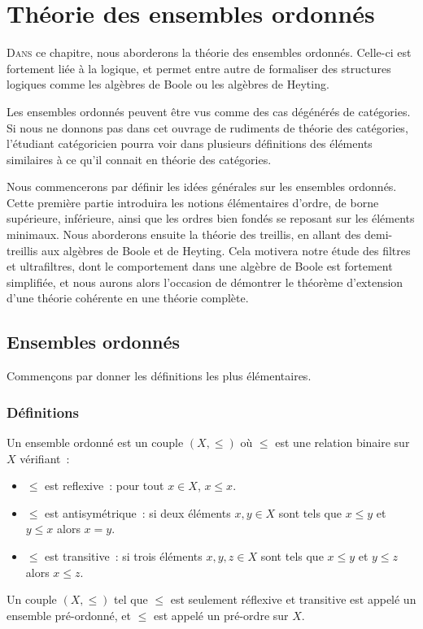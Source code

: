 \chapter{Théorie des ensembles ordonnés}
\label{chp.ordres}

\minitoc

\lettrine{D}{ans} ce chapitre, nous aborderons la théorie des ensembles
ordonnés. Celle-ci est fortement liée à la logique, et permet entre autre de
formaliser des structures logiques comme les algèbres de Boole ou les algèbres
de Heyting. 

Les ensembles ordonnés peuvent être vus comme des cas dégénérés de catégories.
Si nous ne donnons pas dans cet ouvrage de rudiments de théorie des catégories,
l'étudiant catégoricien pourra voir dans plusieurs définitions des éléments
similaires à ce qu'il connait en théorie des catégories.

Nous commencerons par définir les idées générales sur les ensembles ordonnés.
Cette première partie introduira les notions élémentaires d'ordre, de borne
supérieure, inférieure, ainsi que les ordres bien fondés se reposant sur les
éléments minimaux.
Nous aborderons ensuite la théorie des treillis, en allant des demi-treillis aux
algèbres de Boole et de Heyting.
Cela motivera notre étude des filtres et ultrafiltres, dont le comportement dans
une algèbre de Boole est fortement simplifiée, et nous aurons alors l'occasion
de démontrer le théorème d'extension d'une théorie cohérente en une théorie
complète.

\section{Ensembles ordonnés}

Commençons par donner les définitions les plus élémentaires.

\subsection{Définitions}

\begin{definition}
  Un ensemble ordonné est un couple $(X,\leq)$ où $\leq$ est une relation
  binaire sur $X$ vérifiant~:
  \begin{itemize}
  \item $\leq$ est reflexive~: pour tout $x\in X$, $x\leq x$.
  \item $\leq$ est antisymétrique~: si deux éléments $x,y\in X$ sont tels que
    $x\leq y$ et $y\leq x$ alors $x = y$.
  \item $\leq$ est transitive~: si trois éléments $x,y,z\in X$ sont tels que
    $x\leq y$ et $y\leq z$ alors $x\leq z$.
  \end{itemize}

  Un couple $(X,\leq)$ tel que $\leq$ est seulement réflexive et transitive est
  appelé un ensemble pré-ordonné, et $\leq$ est appelé un pré-ordre sur $X$.
\end{definition}

